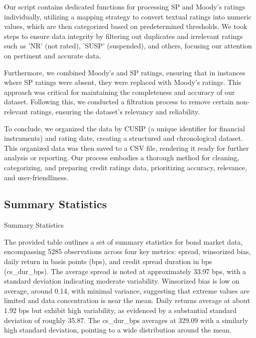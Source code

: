\documentclass[12pt]{article}
\begin{document}
Our script contains dedicated functions for processing SP and Moody's ratings individually, utilizing a mapping strategy to convert textual ratings into numeric values, which are then categorized based on predetermined thresholds. We took steps to ensure data integrity by filtering out duplicates and irrelevant ratings such as 'NR' (not rated), 'SUSP' (suspended), and others, focusing our attention on pertinent and accurate data.

Furthermore, we combined Moody's and SP ratings, ensuring that in instances where SP ratings were absent, they were replaced with Moody's ratings. This approach was critical for maintaining the completeness and accuracy of our dataset. Following this, we conducted a filtration process to remove certain non-relevant ratings, ensuring the dataset's relevancy and reliability.

To conclude, we organized the data by CUSIP (a unique identifier for financial instruments) and rating date, creating a structured and chronological dataset. This organized data was then saved to a CSV file, rendering it ready for further analysis or reporting. Our process embodies a thorough method for cleaning, categorizing, and preparing credit ratings data, prioritizing accuracy, relevance, and user-friendliness.

\subsection{Summary Statistics}
\begin{table}[ht]
\centering

\caption{Summary Statistics}
\label{tab:summary_stats}
\end{table}
\newline
\newline
The provided table outlines a set of summary statistics for bond market data, encompassing 5285 observations across four key metrics: spread, winsorized bias, daily return in basis points (bps), and credit spread duration in bps (cs\_dur\_bps). The average spread is noted at approximately 33.97 bps, with a standard deviation indicating moderate variability. Winsorized bias is low on average, around 0.14, with minimal variance, suggesting that extreme values are limited and data concentration is near the mean. Daily returns average at about 1.92 bps but exhibit high variability, as evidenced by a substantial standard deviation of roughly 35.87. The cs\_dur\_bps averages at 329.09 with a similarly high standard deviation, pointing to a wide distribution around the mean.
\end{document}
